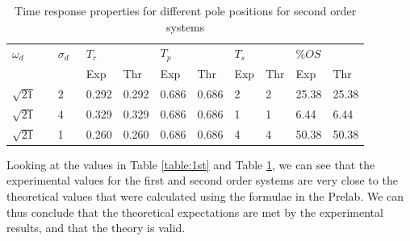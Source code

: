 \documentclass[a4paper, 12pt]{article}
\begin{document}
		\begin{table}[H]
			\begin{tabularx}{\textwidth}{X X X X X X X X X X X X}
			\toprule
			\multicolumn{2}{X}{$\omega_d$} & \multicolumn{2}{X}{$\sigma_d$} & \multicolumn{2}{X}{$T_r$} & \multicolumn{2}{X}{$T_p$} & \multicolumn{2}{X}{$T_s$} & \multicolumn{2}{X}{$\%OS$} \\
			 & & & & Exp & Thr & Exp & Thr & Exp & Thr & Exp & Thr \\
			\midrule
			$\sqrt{21}$ & & 2 & & 0.292 & 0.292 & 0.686 & 0.686 & 2 & 2 & 25.38 & 25.38 \\
			$\sqrt{21}$ & & 4 & & 0.329 & 0.329 & 0.686 & 0.686 & 1 & 1 & 6.44 & 6.44 \\
			$\sqrt{21}$ & & 1 & & 0.260 & 0.260 & 0.686 & 0.686 & 4 & 4 & 50.38 & 50.38 \\
			\bottomrule
			\end{tabularx}
			\caption{Time response properties for different pole positions for second order systems}
			\label{table:2nd}
		\end{table}

		Looking at the values in Table \ref{table:1st} and Table \ref{table:2nd}, we can see that the experimental values for the first and second order systems are very close to the theoretical values that were calculated using the formulae in the Prelab. We can thus conclude that the theoretical expectations are met by the experimental results, and that the theory is valid.
\end{document}
